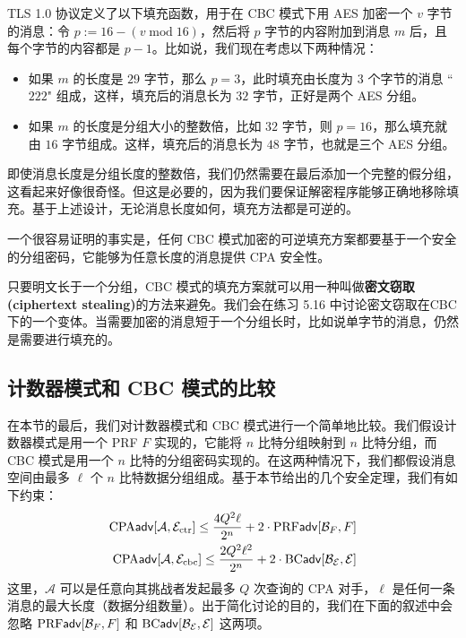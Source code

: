 TLS 1.0 协议定义了以下填充函数，用于在 CBC 模式下用 AES 加密一个 $v$ 字节的消息：令 $p:=16-(v\;\mathrm{mod}\;16)$，然后将 $p$ 字节的内容附加到消息 $m$ 后，且每个字节的内容都是 $p-1$。比如说，我们现在考虑以下两种情况：
\begin{itemize}
	\item 如果 $m$ 的长度是 $29$ 字节，那么 $p = 3$，此时填充由长度为 $3$ 个字节的消息 ``$222$" 组成，这样，填充后的消息长为 $32$ 字节，正好是两个 AES 分组。
	\item 如果 $m$ 的长度是分组大小的整数倍，比如 $32$ 字节，则 $p = 16$，那么填充就由 $16$ 字节组成。这样，填充后的消息长为 $48$ 字节，也就是三个 AES 分组。
\end{itemize}
即使消息长度是分组长度的整数倍，我们仍然需要在最后添加一个完整的假分组，这看起来好像很奇怪。但这是必要的，因为我们要保证解密程序能够正确地移除填充。基于上述设计，无论消息长度如何，填充方法都是可逆的。

一个很容易证明的事实是，任何 CBC 模式加密的可逆填充方案都要基于一个安全的分组密码，它能够为任意长度的消息提供 CPA 安全性。

只要明文长于一个分组，CBC 模式的填充方案就可以用一种叫做\textbf{密文窃取 (ciphertext stealing)}的方法来避免。我们会在练习 5.16 中讨论密文窃取在CBC下的一个变体。当需要加密的消息短于一个分组长时，比如说单字节的消息，仍然是需要进行填充的。

\subsection{计数器模式和 CBC 模式的比较}\label{subsec:5-4-5}

在本节的最后，我们对计数器模式和 CBC 模式进行一个简单地比较。我们假设计数器模式是用一个 PRF $F$ 实现的，它能将 $n$ 比特分组映射到 $n$ 比特分组，而 CBC 模式是用一个 $n$ 比特的分组密码实现的。在这两种情况下，我们都假设消息空间由最多 $\ell$ 个 $n$ 比特数据分组组成。基于本节给出的几个安全定理，我们有如下约束：
\[
\begin{aligned}
{\rm CPA}\mathsf{adv}[\mathcal{A}, \mathcal{E}_{\rm ctr}]\leq\frac{4Q^2\ell}{2^n}+2\cdot{\rm PRF}\mathsf{adv}[\mathcal{B}_F,F]\\
{\rm CPA}\mathsf{adv}[\mathcal{A},\mathcal{E}_{\rm cbc}]\leq\frac{2Q^2\ell^2}{2^n}+2\cdot{\rm BC}\mathsf{adv}[\mathcal{B}_\mathcal{E},\mathcal{E}]
\end{aligned}
\]
这里，$\mathcal{A}$ 可以是任意向其挑战者发起最多 $Q$ 次查询的 CPA 对手，$\ell$ 是任何一条消息的最大长度（数据分组数量）。出于简化讨论的目的，我们在下面的叙述中会忽略 ${\rm PRF}\mathsf{adv}[\mathcal{B}_F,F]$ 和 ${\rm BC}\mathsf{adv}[\mathcal{B}_\mathcal{E},\mathcal{E}]$ 这两项。

